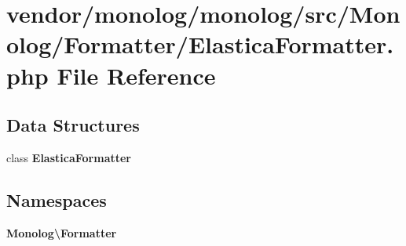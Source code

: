 \section{vendor/monolog/monolog/src/\+Monolog/\+Formatter/\+Elastica\+Formatter.php File Reference}
\label{_elastica_formatter_8php}
\subsection*{Data Structures}
\begin{DoxyCompactItemize}
\item 
class {\bf Elastica\+Formatter}
\end{DoxyCompactItemize}
\subsection*{Namespaces}
\begin{DoxyCompactItemize}
\item 
 {\bf Monolog\textbackslash{}\+Formatter}
\end{DoxyCompactItemize}
